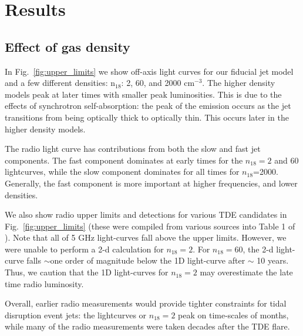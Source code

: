 \documentclass[usenatbib,fleqn]{mnras}
\begin{document}
\section{Results}
\label{sec:results}

\subsection{Effect of gas density}

In Fig.~\ref{fig:upper_limits} we show off-axis light curves for our
fiducial jet model and a few different densities: n$_{18}$: 2,
60, and 2000 cm$^{-3}$. The higher density models peak at later times with
smaller peak luminosities.  This is due to the effects of synchrotron
self-absorption: the peak of the emission occurs as the jet
transitions from being optically thick to optically thin. This occurs
later in the higher density models.

The radio light curve has contributions from both the slow and fast
jet components. The fast component dominates at early times for the
$n_{18}=2$ and 60 lightcurves, while the slow component dominates for
all times for $n_{18}$=2000. Generally, the fast
component is more important at higher frequencies, and lower
densities. 

We also show radio upper limits and detections for various TDE
candidates in Fig.~\ref{fig:upper_limits} (these were compiled from
various sources into Table 1 of \citealt{Mimica+2015}). Note that all
of 5 GHz light-curves fall above the upper limits. However, we were
unable to perform a 2-d calculation for $n_{18}=2$.  For $n_{18}=60$,
the 2-d light-curve falls $\sim$one order of magnitude below the 1D
light-curve after $\sim$ 10 years. Thus, we caution that the 1D
light-curves for $n_{18}=2$ may overestimate the late time radio
luminosity.

Overall, earlier radio measurements would provide tighter constraints
for tidal disruption event jets: the lightcurves or $n_{18}=2$ peak on
time-scales of months, while many of the radio measurements were taken
decades after the TDE flare.
\end{document}
